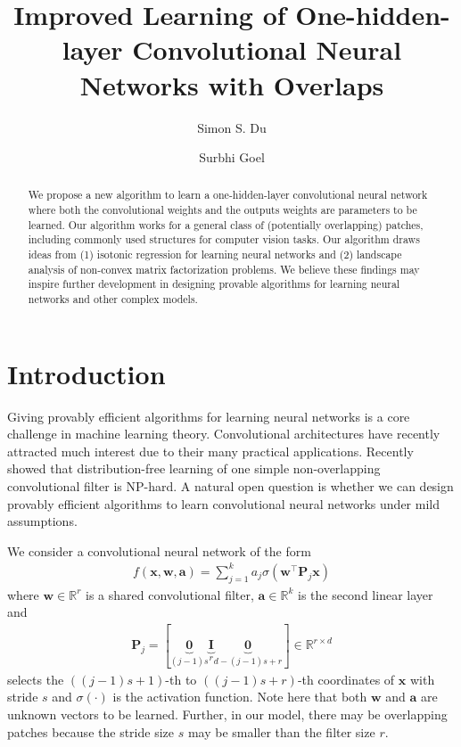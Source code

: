 \documentclass[11pt]{article}
\title{Improved Learning of One-hidden-layer Convolutional Neural Networks with Overlaps}
\author[1]{Simon S. Du}
\author[2]{Surbhi Goel}
\affil[1]{Machine Learning Department, Carnegie Mellon University}
\affil[2]{Department of Computer Science, University of Texas at Austin}
\newcommand{\mat}[1]{\mathbf{#1}}
\newcommand{\vect}[1]{\mathbf{#1}}
\newcommand{\relu}[1]{\sigma\left(#1\right)}
\begin{document}
\maketitle
\begin{abstract}
We propose a new algorithm to learn a one-hidden-layer convolutional neural network where both the convolutional weights and the outputs weights are parameters to be learned. Our algorithm works for a general class of (potentially overlapping) patches, including commonly used structures for computer vision tasks. Our algorithm draws ideas from (1) isotonic regression for learning neural networks and (2) landscape analysis of non-convex matrix factorization problems. We believe these findings may inspire further development in designing provable algorithms for learning neural networks and other complex models.

\end{abstract}

\section{Introduction}
\label{sec:intro}
Giving provably efficient algorithms for learning neural networks is a core challenge in machine learning theory.  Convolutional architectures have recently attracted much interest due to their many practical applications.  Recently \citet{brutzkus2017globally} showed that distribution-free learning of one simple non-overlapping convolutional filter is NP-hard.  A natural open question is whether we can design provably efficient algorithms to learn convolutional neural networks under mild assumptions. 

We consider a convolutional neural network of the form
\begin{align}
f\left(\vect{x},\vect{w},\vect{a}\right)= \sum_{j=1}^{k} a_j \relu{\vect{w}^\top\mat{P}_j\vect{x}} \label{eqn:cnn_structure}
\end{align}
where $\vect{w} \in \mathbb{R}^r$ is a shared convolutional filter, $\vect{a} \in \mathbb{R}^{k}$ is the second linear  layer and\begin{align*}
\mat{P}_j = [
\underbrace{\mat{0}}_{(j-1)s}  \underbrace{\mat{I}}_r  \underbrace{\mat{0}}_{d-(j-1)s+r}]\in \mathbb{R}^{r \times d}
\end{align*} 
selects the $((j-1)s+1)$-th to $((j-1)s+r)$-th coordinates of $\vect{x}$ with stride $s$ and $\sigma\left(\cdot\right)$ is the activation function.
Note here that both $\vect{w}$ and $\vect{a}$ are unknown vectors to be learned.
Further, in our model, there may be overlapping patches because the stride size $s$ may be smaller than the filter size $r$.
\end{document}
